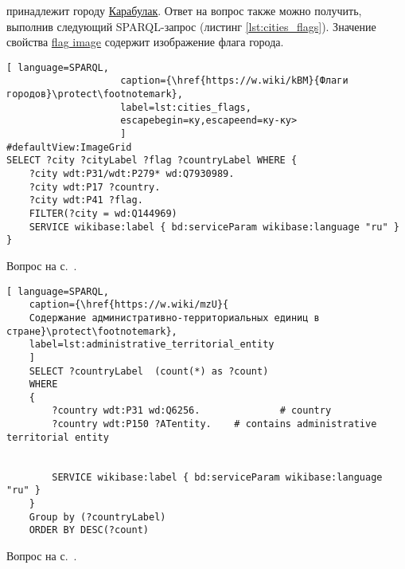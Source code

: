 \begin{task}
    \label{answer:cities_flags}
     принадлежит городу \href{https://bit.ly/2IqZivr}{Карабулак}. Ответ на вопрос также можно получить, выполнив следующий SPARQL-запрос (листинг \ref{lst:cities_flags}). Значение свойства \href{https://www.wikidata.org/wiki/Property:P41}{flag image} содержит изображение флага города.
    
    \begin{lstlisting}[ language=SPARQL, 
                    caption={\href{https://w.wiki/kBM}{Флаги городов}\protect\footnotemark},
                    label=lst:cities_flags, 
                    escapebegin=ку,escapeend=ку-ку>
                    ]
#defaultView:ImageGrid
SELECT ?city ?cityLabel ?flag ?countryLabel WHERE {
	?city wdt:P31/wdt:P279* wd:Q7930989.
	?city wdt:P17 ?country.
	?city wdt:P41 ?flag.
	FILTER(?city = wd:Q144969)
	SERVICE wikibase:label { bd:serviceParam wikibase:language "ru" }
}
\end{lstlisting}
    
    \small{Вопрос на с.~\pageref{lst:countries_sister_cities_with_Russia}.}
\end{task}


\begin{task}
	\label{answer:administrative_territorial}
	
	\begin{lstlisting}[ language=SPARQL, 
	caption={\href{https://w.wiki/mzU}{
	Содержание административно-территориальных единиц в стране}\protect\footnotemark},
	label=lst:administrative_territorial_entity
	]
	SELECT ?countryLabel  (count(*) as ?count)
	WHERE
	{
		?country wdt:P31 wd:Q6256.              # country
		?country wdt:P150 ?ATentity.    # contains administrative territorial entity
		
		
		SERVICE wikibase:label { bd:serviceParam wikibase:language "ru" }
	}
	Group by (?countryLabel)
	ORDER BY DESC(?count)
	\end{lstlisting}
	
	\small{Вопрос на с.~\pageref{lst:age_of_country}.}
\end{task}

